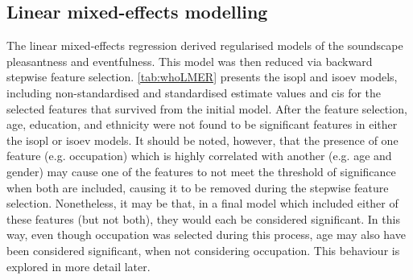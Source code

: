 \subsection{Linear mixed-effects modelling}
\label{sec:whoLMERinit}
The linear mixed-effects regression derived regularised models of the soundscape pleasantness and eventfulness. This model was then reduced via backward stepwise feature selection. \cref{tab:whoLMER} presents the \gls{isopl} and \gls{isoev} models, including non-standardised and standardised estimate values and \glspl{ci} for the selected features that survived from the initial model. After the feature selection, age, education, and ethnicity were not found to be significant features in either the \gls{isopl} or \gls{isoev} models. It should be noted, however, that the presence of one feature (e.g. occupation) which is highly correlated with another (e.g. age and gender) may cause one of the features to not meet the threshold of significance when both are included, causing it to be removed during the stepwise feature selection. Nonetheless, it may be that, in a final model which included either of these features (but not both), they would each be considered significant. In this way, even though occupation was selected during this process, age may also have been considered significant, when not considering occupation. This behaviour is explored in more detail later.




